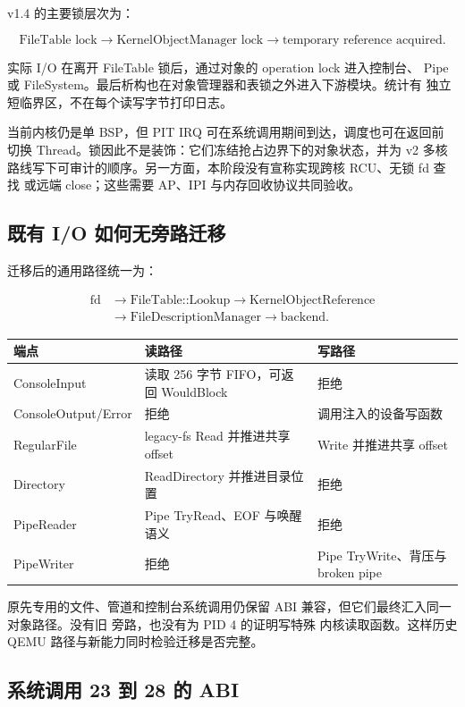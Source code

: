 v1.4 的主要锁层次为：

\[
  \text{FileTable lock}
  \rightarrow \text{KernelObjectManager lock}
  \rightarrow \text{temporary reference acquired}.
\]

实际 I/O 在离开 FileTable 锁后，通过对象的 operation lock 进入控制台、
Pipe 或 FileSystem。最后析构也在对象管理器和表锁之外进入下游模块。统计有
独立短临界区，不在每个读写字节打印日志。

当前内核仍是单 BSP，但 PIT IRQ 可在系统调用期间到达，调度也可在返回前
切换 Thread。锁因此不是装饰：它们冻结抢占边界下的对象状态，并为 v2 多核
路线写下可审计的顺序。另一方面，本阶段没有宣称实现跨核 RCU、无锁 fd 查找
或远端 close；这些需要 AP、IPI 与内存回收协议共同验收。

\subsection{既有 I/O 如何无旁路迁移}

迁移后的通用路径统一为：

\[
\begin{aligned}
\text{fd}
&\rightarrow \text{FileTable::Lookup}
\rightarrow \text{KernelObjectReference}\\
&\rightarrow \text{FileDescriptionManager}
\rightarrow \text{backend}.
\end{aligned}
\]

\begin{longtable}{L{0.29\textwidth}L{0.29\textwidth}L{0.30\textwidth}}
\toprule
端点 & 读路径 & 写路径\\
\midrule
ConsoleInput & 读取 256 字节 FIFO，可返回 WouldBlock & 拒绝\\
ConsoleOutput/Error & 拒绝 & 调用注入的设备写函数\\
RegularFile & legacy-fs Read 并推进共享 offset & Write 并推进共享 offset\\
Directory & ReadDirectory 并推进目录位置 & 拒绝\\
PipeReader & Pipe TryRead、EOF 与唤醒语义 & 拒绝\\
PipeWriter & 拒绝 & Pipe TryWrite、背压与 broken pipe\\
\bottomrule
\end{longtable}

原先专用的文件、管道和控制台系统调用仍保留 ABI 兼容，但它们最终汇入同一
对象路径。没有旧  旁路，也没有为 PID 4 的证明写特殊
内核读取函数。这样历史 QEMU 路径与新能力同时检验迁移是否完整。

\subsection{系统调用 23 到 28 的 ABI}

